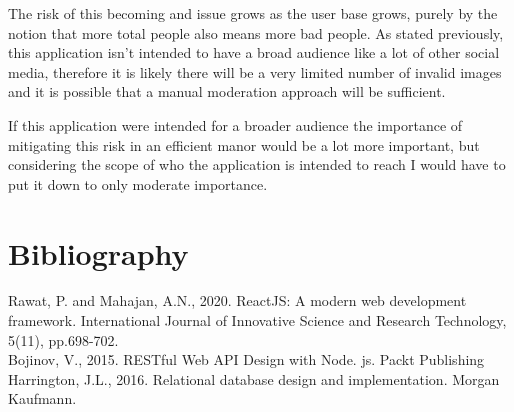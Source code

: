 \documentclass{article}
\begin{document}
\noindent
The risk of this becoming and issue grows as the user base grows, purely by the notion that more total people also means more bad people. As stated previously, this application isn't intended to have a broad audience like a lot of other social media, therefore it is likely there will be a very limited number of invalid images and it is possible that a manual moderation approach will be sufficient.

If this application were intended for a broader audience the importance of mitigating this risk in an efficient manor would be a lot more important, but considering the scope of who the application is intended to reach I would have to put it down to only moderate importance.

\section{Bibliography}

\noindent
Rawat, P. and Mahajan, A.N., 2020. ReactJS: A modern web development framework. International Journal of Innovative Science and Research Technology, 5(11), pp.698-702.\\

\noindent
Bojinov, V., 2015. RESTful Web API Design with Node. js. Packt Publishing\\

\noindent
Harrington, J.L., 2016. Relational database design and implementation. Morgan Kaufmann.\\
\end{document}
